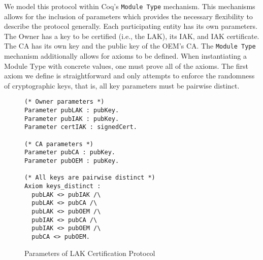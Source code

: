 We model this protocol within Coq's \verb|Module Type| mechanism. This mechanisms allows for the inclusion of parameters which provides the necessary flexibility to describe the protocol generally. Each participating entity has its own parameters. The Owner has a key to be certified (i.e., the LAK), its IAK, and IAK certificate. The CA has its own key and the public key of the OEM's CA. The \verb|Module Type| mechanism additionally allows for axioms to be defined. When instantiating a Module Type with concrete values, one must prove all of the axioms. The first axiom we define is straightforward and only attempts to enforce the randomness of cryptographic keys, that is, all key parameters must be pairwise distinct.
\begin{figure}[h]
\begin{lstlisting}[language=Coq]
(* Owner parameters *)
Parameter pubLAK : pubKey.
Parameter pubIAK : pubKey.
Parameter certIAK : signedCert.

(* CA parameters *)
Parameter pubCA : pubKey.
Parameter pubOEM : pubKey.

(* All keys are pairwise distinct *)
Axiom keys_distinct :
  pubLAK <> pubIAK /\
  pubLAK <> pubCA /\
  pubLAK <> pubOEM /\
  pubIAK <> pubCA /\
  pubIAK <> pubOEM /\
  pubCA <> pubOEM.
\end{lstlisting}
\caption{Parameters of LAK Certification Protocol}
\end{figure}


